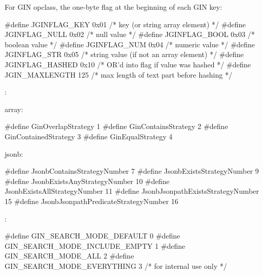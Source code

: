 For  GIN opclass, the one-byte flag at the beginning of
each GIN key:

\begin{ccode}
#define JGINFLAG_KEY    0x01    /* key (or string array element) */
#define JGINFLAG_NULL   0x02    /* null value */
#define JGINFLAG_BOOL   0x03    /* boolean value */
#define JGINFLAG_NUM    0x04    /* numeric value */
#define JGINFLAG_STR    0x05    /* string value (if not an array element) */
#define JGINFLAG_HASHED 0x10    /* OR'd into flag if value was hashed */
#define JGIN_MAXLENGTH  125     /* max length of text part before hashing */
\end{ccode}

:

\begin{oparts}
\item array:
  \begin{ccode}
  #define GinOverlapStrategy      1
  #define GinContainsStrategy     2
  #define GinContainedStrategy    3
  #define GinEqualStrategy        4
  \end{ccode}
\item jsonb:
  \begin{ccode}
  #define JsonbContainsStrategyNumber   7
  #define JsonbExistsStrategyNumber   9
  #define JsonbExistsAnyStrategyNumber  10
  #define JsonbExistsAllStrategyNumber  11
  #define JsonbJsonpathExistsStrategyNumber   15
  #define JsonbJsonpathPredicateStrategyNumber  16
  \end{ccode}
\end{oparts}

:

\begin{ccode}
#define GIN_SEARCH_MODE_DEFAULT         0
#define GIN_SEARCH_MODE_INCLUDE_EMPTY   1
#define GIN_SEARCH_MODE_ALL             2
#define GIN_SEARCH_MODE_EVERYTHING      3   /* for internal use only */
\end{ccode}
